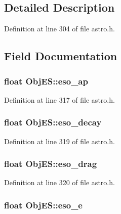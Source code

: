 \subsection{Detailed Description}


Definition at line 304 of file astro.\-h.



\subsection{Field Documentation}
\hypertarget{struct_obj_e_s_ac284ba51510c470c5672dc49f72777d6}{
\subsubsection[{eso\-\_\-ap}]{\setlength{\rightskip}{0pt plus 5cm}float Obj\-E\-S\-::eso\-\_\-ap}}\label{struct_obj_e_s_ac284ba51510c470c5672dc49f72777d6}


Definition at line 317 of file astro.\-h.

\hypertarget{struct_obj_e_s_ad784c67228eff476b3ba6f807534889a}{
\subsubsection[{eso\-\_\-decay}]{\setlength{\rightskip}{0pt plus 5cm}float Obj\-E\-S\-::eso\-\_\-decay}}\label{struct_obj_e_s_ad784c67228eff476b3ba6f807534889a}


Definition at line 319 of file astro.\-h.

\hypertarget{struct_obj_e_s_a52ee31a4760f42b6cd3d3a135b432ddd}{
\subsubsection[{eso\-\_\-drag}]{\setlength{\rightskip}{0pt plus 5cm}float Obj\-E\-S\-::eso\-\_\-drag}}\label{struct_obj_e_s_a52ee31a4760f42b6cd3d3a135b432ddd}


Definition at line 320 of file astro.\-h.

\hypertarget{struct_obj_e_s_a4d259cf59761ca0815135a61a8c27fa7}{
\subsubsection[{eso\-\_\-e}]{\setlength{\rightskip}{0pt plus 5cm}float Obj\-E\-S\-::eso\-\_\-e}}\label{struct_obj_e_s_a4d259cf59761ca0815135a61a8c27fa7}


